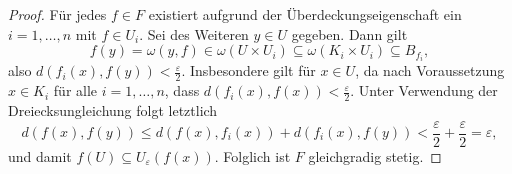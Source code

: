 \begin{proof}
  Für jedes $f \in F$ existiert aufgrund der Überdeckungseigenschaft ein $i = 1,\dots,n$ mit $f \in U_i$.
  Sei des Weiteren $y \in U$ gegeben.
  Dann gilt
  \begin{displaymath}
    f(y) = \omega(y,f) \in \omega(U \times U_i) \subseteq \omega(K_i \times U_i) \subseteq B_{f_i},
  \end{displaymath}
  also $d(f_i(x),f(y)) < \tfrac{\varepsilon}{2}$.
  Insbesondere gilt für $x \in U$, da nach Voraussetzung $x \in K_i$ für alle $i = 1,\dots,n$, dass $d(f_i(x),f(x)) < \tfrac{\varepsilon}{2}$.
  Unter Verwendung der Dreiecksungleichung folgt letztlich
  \begin{displaymath}
    d(f(x),f(y)) \leq d(f(x),f_i(x)) + d(f_i(x),f(y)) < \frac{\varepsilon}{2} + \frac{\varepsilon}{2} = \varepsilon,
  \end{displaymath}
  und damit $f(U) \subseteq U_\varepsilon(f(x))$.
  Folglich ist $F$ gleichgradig stetig.


\end{proof}
